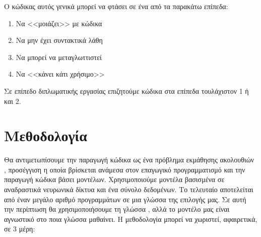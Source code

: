 Ο κώδικας αυτός γενικά μπορεί να φτάσει σε ένα από τα παρακάτω επίπεδα:

\begin{enumerate}
\item Να <<μοιάζει>> με κώδικα
\item Να μην έχει συντακτικά λάθη
\item Να μπορεί να μεταγλωττιστεί
\item Να <<κάνει κάτι χρήσιμο>>
\end{enumerate}

Σε επίπεδο διπλωματικής εργασίας επιζητούμε κώδικα στα επίπεδα τουλάχιστον 1 ή και 2.

\section{Μεθοδολογία}
Θα αντιμετωπίσουμε την παραγωγή κώδικα ως ένα πρόβλημα εκμάθησης ακολουθιών , προσέγγιση η οποία βρίσκεται ανάμεσα στον επαγωγικό προγραμματισμό και την παραγωγή κώδικα βάσει μοντέλων.
Χρησιμοποιούμε μοντέλα βασισμένα σε αναδραστικά νευρωνικά δίκτυα και ένα σύνολο δεδομένων. 
Το τελευταίο αποτελείται από έναν μεγάλο αριθμό προγραμμάτων σε μια γλώσσα της επιλογής μας. Σε αυτή την περίπτωση θα χρησιμοποιήσουμε τη γλώσσα , αλλά το μοντέλο μας είναι αγνωστικό στο ποια γλώσσα μαθαίνει.
Η μεθοδολογία μπορεί να χωριστεί, αφαιρετικά, σε 3 μέρη:


